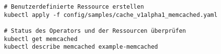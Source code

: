\begin{verbatim}
# Benutzerdefinierte Ressource erstellen
kubectl apply -f config/samples/cache_v1alpha1_memcached.yaml

# Status des Operators und der Ressourcen überprüfen
kubectl get memcached
kubectl describe memcached example-memcached
\end{verbatim}
